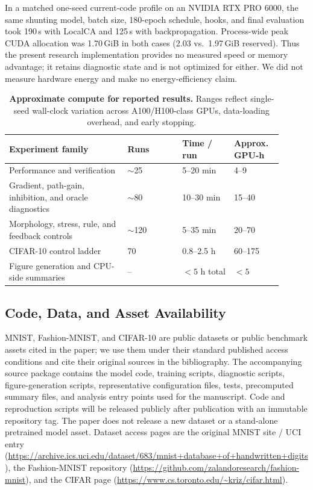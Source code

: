    In a matched one-seed current-code profile on an NVIDIA RTX PRO 6000, the same shunting model, batch size, 180-epoch schedule, hooks, and final evaluation took 190\,s with LocalCA and 125\,s with backpropagation. Process-wide peak CUDA allocation was 1.70\,GiB in both cases (2.03 vs.\ 1.97\,GiB reserved). Thus the present research implementation provides no measured speed or memory advantage; it retains diagnostic state and is not optimized for either. We did not measure hardware energy and make no energy-efficiency claim.
    
    \begin{table}[htbp]
    \centering
    \small
    \begin{tabular}{@{}L{0.39\linewidth}L{0.18\linewidth}L{0.17\linewidth}L{0.16\linewidth}@{}}
    \toprule
    \textbf{Experiment family} & \textbf{Runs} & \textbf{Time / run} & \textbf{Approx. GPU-h} \\
    \midrule
    Performance and verification & $\sim$25 & 5--20 min & 4--9 \\
    Gradient, path-gain, inhibition, and oracle diagnostics & $\sim$80 & 10--30 min & 15--40 \\
    Morphology, stress, rule, and feedback controls & $\sim$120 & 5--35 min & 20--70 \\
    CIFAR-10 control ladder & 70 & 0.8--2.5 h & 60--175 \\
    Figure generation and CPU-side summaries & -- & $<5$ h total & $<5$ \\
    \bottomrule
    \end{tabular}
    \caption{\textbf{Approximate compute for reported results.} Ranges reflect single-seed wall-clock variation across A100/H100-class GPUs, data-loading overhead, and early stopping.}
    \label{tab:compute_resources}
    \end{table}
    
    \subsection{Code, Data, and Asset Availability}
    \label{app:code_data_assets}
    MNIST, Fashion-MNIST, and CIFAR-10 are public datasets or public benchmark assets cited in the paper; we use them under their standard published access conditions and cite their original sources in the bibliography. The accompanying source package contains the model code, training scripts, diagnostic scripts, figure-generation scripts, representative configuration files, tests, precomputed summary files, and analysis entry points used for the manuscript. Code and reproduction scripts will be released publicly after publication with an immutable repository tag. The paper does not release a new dataset or a stand-alone pretrained model asset.
    Dataset access pages are the original MNIST site / UCI entry (\url{https://archive.ics.uci.edu/dataset/683/mnist+database+of+handwritten+digits}), the Fashion-MNIST repository (\url{https://github.com/zalandoresearch/fashion-mnist}), and the CIFAR page (\url{https://www.cs.toronto.edu/~kriz/cifar.html}).
    
